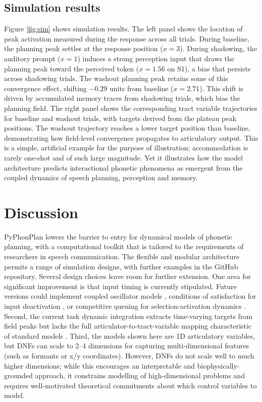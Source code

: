 \documentclass[cameraready]{Interspeech}
\begin{document}
\subsection{Simulation results}
Figure \ref{fig:sim} shows simulation results. The left panel shows the location of peak activation measured during the response across all trials. During baseline, the planning peak settles at the response position ($x = 3$). During shadowing, the auditory prompt ($x = 1$) induces a strong perception input that draws the planning peak toward the perceived token ($x = 1.56$ on S1), a bias that persists across shadowing trials. The washout planning peak retains some of this convergence effect, shifting $-0.29$ units from baseline ($x = 2.71$). This shift is driven by accumulated memory traces from shadowing trials, which bias the planning field. The right panel shows the corresponding tract variable trajectories for baseline and washout trials, with targets derived from the plateau peak positions. The washout trajectory reaches a lower target position than baseline, demonstrating how field-level convergence propagates to articulatory output. This is a simple, artificial example for the purpose of illustration; accommodation is rarely one-shot and of such large magnitude. Yet it illustrates how the model architecture predicts interactional phonetic phenomena as emergent from the coupled dynamics of speech planning, perception and memory. 


\section{Discussion}
\label{discussion}

PyPhonPlan lowers the barrier to entry for dynamical models of phonetic planning, with a computational toolkit that is tailored to the requirements of researchers in speech communication. The flexible and modular architecture permits a range of simulation designs, with further examples in the GitHub repository. Several design choices leave room for further extension. One area for significant improvement is that input timing is currently stipulated. Future versions could implement coupled oscillator models \cite{nam-saltzman2003}, conditions of satisfaction for input deactivation \cite{sandamirskaya-schoner2010, chaturvedi-shaw2025b}, or competitive queuing for selection-activation dynamics \cite{tilsen2016, tilsen2022}. Second, the current task dynamic integration extracts time-varying targets from field peaks but lacks the full articulator-to-tract-variable mapping characteristic of standard models \cite{saltzman-munhall1989}. Third, the models shown here are 1D articulatory variables, but DNFs can scale to 2--4 dimensions for capturing multi-dimensional features (such as formants or x/y coordinates). However, DNFs do not scale well to much higher dimensions; while this encourages an interpretable and biophysically-grounded approach, it constrains modelling of high-dimensional problems and requires well-motivated theoretical commitments about which control variables to model.
\end{document}

